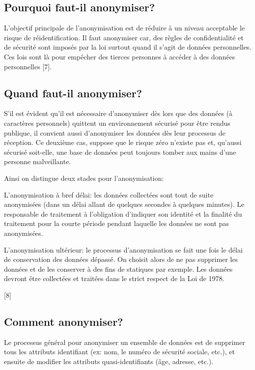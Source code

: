 \subsection{Pourquoi faut-il anonymiser?} 

L’objectif principale de l’anonymisation est de réduire à un niveau acceptable le risque de réidentification. Il faut anonymiser car, des règles de confidentialité et de sécurité sont imposés par la loi surtout quand il s’agit de données personnelles. Ces lois sont là pour empêcher des tierces personnes à accéder à des données personnelles [7]. 

\subsection{Quand faut-il anonymiser?} 

S’il est évident qu’il est nécessaire d’anonymiser dès lors que des données (à caractères personnels) quittent un environnement sécurisé pour être rendus publique, il convient aussi d’anonymiser les données dès leur processus de réception. Ce deuxième cas, suppose que le risque zéro n’existe pas et, qu’aussi sécurisé soit-elle, une base de données peut toujours tomber aux mains d’une personne malveillante. 

Ainsi on distingue deux stades pour l’anonymisation: 

L’anonymisation à bref délai: les données collectées sont tout de suite anonymisées (dans un délai allant de quelques secondes à quelques minutes). Le responsable de traitement à l’obligation d’indiquer son identité et la finalité du traitement pour la courte période pendant laquelle les données ne sont pas anonymisées.  

L’anonymisation ultérieur: le processus d’anonymisation se fait une fois le délai de conservation des données dépassé. On choisit alors de ne pas supprimer les données et de les conserver à des fins de statiques par exemple. Les données devront être collectées et traitées dans le strict respect de la Loi de 1978. 

[8] 

\subsection{Comment anonymiser?} 

Le processus général pour anonymiser un ensemble de données est de supprimer tous les attributs identifiant (ex: nom, le numéro de sécurité sociale, etc.), et ensuite de modifier les attributs quasi-identifiants (âge, adresse, etc.).  

